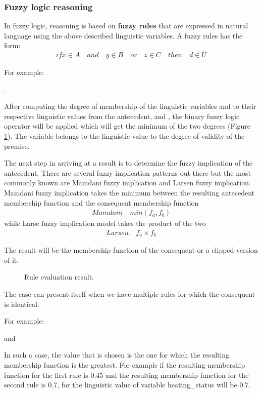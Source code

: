 \documentclass[conference]{IEEEtran}
\let\Oldsubsubsection\subsubsection
\renewcommand{\subsubsection}{\FloatBarrier\Oldsubsubsection}
\begin{document}
\subsubsection{Fuzzy logic reasoning}

In fuzzy logic, reasoning is based on \textbf{fuzzy rules} that are expressed in natural language using the
above described linguistic variables. A fuzzy rules has the form:
\begin{align}
if x \in A \quad and \quad y \in B \quad or \quad z \in C \quad then \quad d \in U
\end{align}

For example: \par
{}.

After computing the degree of membership of the linguistic variables  and  to their
respective linguistic values from the antecedent,  and , the binary fuzzy logic operator 
will be applied which will get the minimum of the two degrees (Figure \ref{fig:rule_eval}).
The variable  belongs to the linguistic value  to the degree of validity of the
premise.

The next step in arriving at a result is to determine the fuzzy implication of the antecedent. There are
several fuzzy implication patterns out there but the most commonly known are Mamdani fuzzy implication and
Larsen fuzzy implication.
Mamdani fuzzy implication takes the minimum between the resulting antecedent membership function and the
consequent membership function
\begin{align}
Mamdani \quad min(f_{a}, f_{b})
\end{align}
while Larse fuzzy implication model takes the product of the two
\begin{align}
Larsen \quad f_{a} \times f_{b}
\end{align}

The result will be the membership function of the consequent or a clipped version of it.
\begin{figure}[h!]
\label{fig:rule_eval}
\centerline{}
      \caption[MainModule]{Rule evaluation result.}
\label{fig:rule_eval}
\end{figure}

The case can present itself when we have multiple rules for which the consequent is identical. \par
For example: \par
{}\par
and \par
{} \par
In such a case, the value that is chosen is the one for which the resulting membership function is the
greatest. For example if the resulting membership function for the first rule is 0.45 and the resulting
membership function for the second rule is 0.7, for the linguistic value  of variable
heating\_status will be 0.7.
\end{document}
